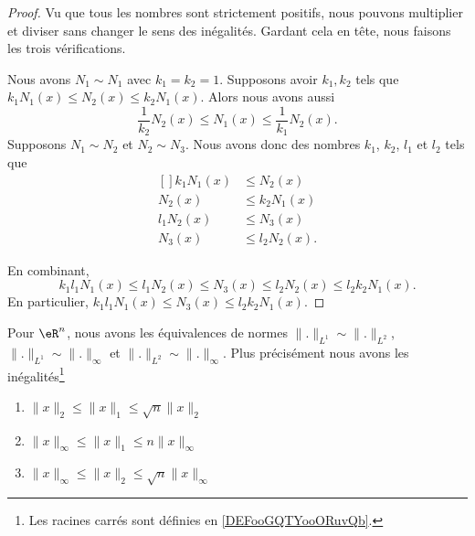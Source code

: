 \begin{proof}
	Vu que tous les nombres sont strictement positifs, nous pouvons multiplier et diviser sans changer le sens des inégalités. Gardant cela en tête, nous faisons les trois vérifications.
	\begin{subproof}
		\spitem[réflexive]
		Nous avons \( N_1\sim N_1\) avec \( k_1=k_2=1\).
		\spitem[Symétrique]
		Supposons avoir \( k_1,k_2\) tels que \( k_1N_1(x)\leq N_2(x)\leq k_2N_1(x)\). Alors nous avons aussi
		\begin{equation}
			\frac{1}{ k_2 }N_2(x)\leq N_1(x)\leq \frac{ 1 }{ k_1 }N_2(x).
		\end{equation}
		\spitem[Transitive]
		Supposons \( N_1\sim N_2\) et \( N_2\sim N_3\). Nous avons donc des nombres \( k_1\), \( k_2\), \( l_1\) et \( l_2\) tels que
		\begin{equation}
			\begin{aligned}[]
				k_1N_1(x) & \leq N_2(x)     \\
				N_2(x)    & \leq k_2N_1(x)  \\
				l_1N_2(x) & \leq N_3(x)     \\
				N_3(x)    & \leq l_2N_2(x).
			\end{aligned}
		\end{equation}
	\end{subproof}
	En combinant,
	\begin{equation}
		k_1l_1N_1(x)\leq l_1N_2(x)\leq N_3(x)\leq l_2N_2(x)\leq l_2k_2N_1(x).
	\end{equation}
	En particulier, $k_1l_1N_1(x) \leq N_3(x)\leq l_2k_2N_1(x)$.
\end{proof}

\begin{proposition} \label{PropLJEJooMOWPNi}
	Pour \( \eR^n\), nous avons les équivalences de normes \( \| . \|_{L^1}\sim\| . \|_{L^2}\), \( \| . \|_{L^1}\sim\| . \|_{\infty}\) et \( \| . \|_{L^2}\sim\| . \|_{\infty}\). Plus précisément nous avons les inégalités\footnote{Les racines carrés sont définies en \ref{DEFooGQTYooORuvQb}.}
	\begin{enumerate}
		\item\label{ItemABSGooQODmLNi}
		\(  \| x \|_2\leq \| x \|_1\leq\sqrt{n}\| x \|_2\)
		\item\label{ItemABSGooQODmLNii}
		\( \| x \|_{\infty}\leq \| x \|_1\leq n \| x \|_{\infty}\)
		\item\label{ItemABSGooQODmLNiii}
		\( \| x \|_{\infty}\leq \| x \|_2\leq \sqrt{n}\| x \|_{\infty}\)
	\end{enumerate}
\end{proposition}

